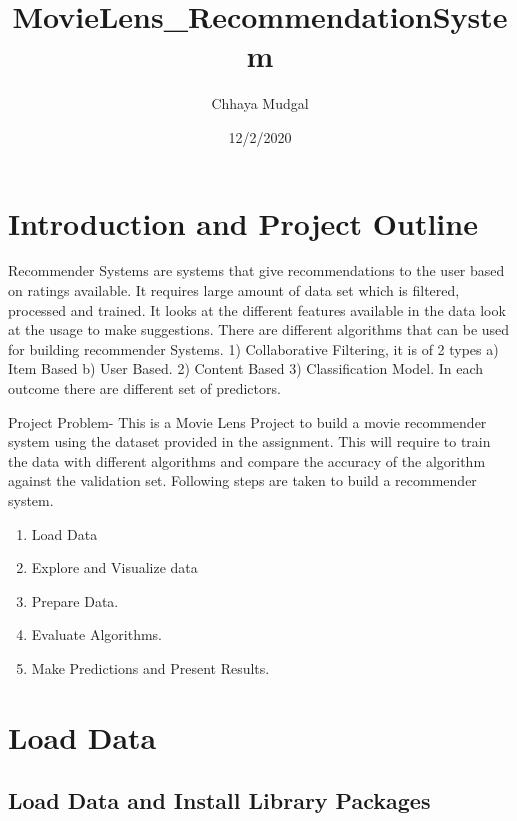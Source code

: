 \documentclass[
]{article}
\title{MovieLens\_RecommendationSystem}
\author{Chhaya Mudgal}
\date{12/2/2020}
\providecommand{\tightlist}{%
  \setlength{\itemsep}{0pt}\setlength{\parskip}{0pt}}
\begin{document}
\maketitle

\hypertarget{introduction-and-project-outline}{%
\section{Introduction and Project
Outline}\label{introduction-and-project-outline}}

Recommender Systems are systems that give recommendations to the user
based on ratings available. It requires large amount of data set which
is filtered, processed and trained. It looks at the different features
available in the data look at the usage to make suggestions. There are
different algorithms that can be used for building recommender Systems.
1) Collaborative Filtering, it is of 2 types a) Item Based b) User
Based. 2) Content Based 3) Classification Model. In each outcome there
are different set of predictors.

Project Problem- This is a Movie Lens Project to build a movie
recommender system using the dataset provided in the assignment. This
will require to train the data with different algorithms and compare the
accuracy of the algorithm against the validation set. Following steps
are taken to build a recommender system.

\begin{enumerate}
\def\labelenumi{\arabic{enumi})}
\tightlist
\item
  Load Data
\item
  Explore and Visualize data
\item
  Prepare Data.
\item
  Evaluate Algorithms.
\item
  Make Predictions and Present Results.
\end{enumerate}

\hypertarget{load-data}{%
\section{Load Data}\label{load-data}}

\hypertarget{load-data-and-install-library-packages}{%
\subsection{Load Data and Install Library
Packages}\label{load-data-and-install-library-packages}}
\end{document}

